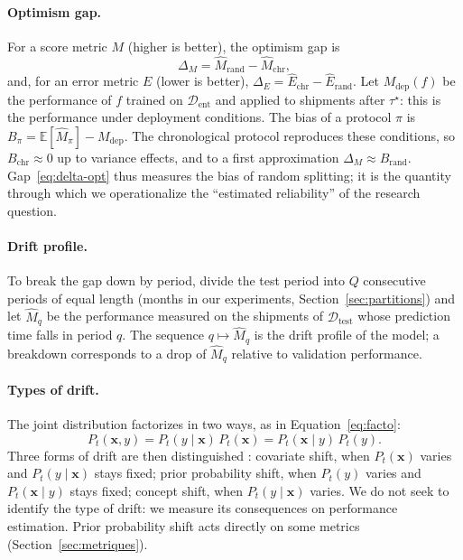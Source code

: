 \documentclass[11pt,a4paper]{article}
\newcommand{\E}{\mathbb{E}}
\theoremstyle{definition}
\begin{document}
\paragraph{Optimism gap.} For a score metric $M$ (higher is better), the optimism gap is
\begin{equation}
  \Delta_M = \widehat{M}_{\mathrm{rand}} - \widehat{M}_{\mathrm{chr}},
  \label{eq:delta-opt}
\end{equation}
and, for an error metric $E$ (lower is better), $\Delta_E = \widehat{E}_{\mathrm{chr}} - \widehat{E}_{\mathrm{rand}}$. Let $M_{\mathrm{dep}}(f)$ be the performance of $f$ trained on $\mathcal{D}_{\mathrm{ent}}$ and applied to shipments after $\tau^\star$: this is the performance under deployment conditions. The bias of a protocol $\pi$ is $B_\pi = \E[\widehat{M}_\pi] - M_{\mathrm{dep}}$. The chronological protocol reproduces these conditions, so $B_{\mathrm{chr}} \approx 0$ up to variance effects, and to a first approximation $\Delta_M \approx B_{\mathrm{rand}}$. Gap~\eqref{eq:delta-opt} thus measures the bias of random splitting; it is the quantity through which we operationalize the ``estimated reliability'' of the research question.

\paragraph{Drift profile.} To break the gap down by period, divide the test period into $Q$ consecutive periods of equal length (months in our experiments, Section~\ref{sec:partitions}) and let $\widehat{M}_q$ be the performance measured on the shipments of $\mathcal{D}_{\mathrm{test}}$ whose prediction time falls in period $q$. The sequence $q \mapsto \widehat{M}_q$ is the drift profile of the model; a breakdown corresponds to a drop of $\widehat{M}_q$ relative to validation performance.

\paragraph{Types of drift.} The joint distribution factorizes in two ways, as in Equation~\eqref{eq:facto}:
\begin{equation}
  P_t(\mathbf{x}, y) = P_t(y \mid \mathbf{x})\, P_t(\mathbf{x}) = P_t(\mathbf{x} \mid y)\, P_t(y).
  \label{eq:facto}
\end{equation}
Three forms of drift are then distinguished \cite{morenotorres2012unifying,gama2014survey}: covariate shift, when $P_t(\mathbf{x})$ varies and $P_t(y\mid\mathbf{x})$ stays fixed; prior probability shift, when $P_t(y)$ varies and $P_t(\mathbf{x}\mid y)$ stays fixed; concept shift, when $P_t(y\mid\mathbf{x})$ varies. We do not seek to identify the type of drift: we measure its consequences on performance estimation. Prior probability shift acts directly on some metrics (Section~\ref{sec:metriques}).
\end{document}
